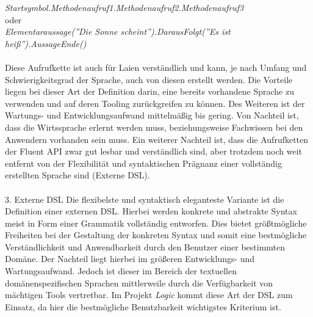\documentclass[11pt,a4paper,bibtotocnumbered]{scrreprt}
\begin{document}
\textit{Startsymbol.Methodenaufruf1.Methodenaufruf2.Methodenaufruf3}\\
oder\\
\textit{Elementaraussage(''Die Sonne scheint'').DarausFolgt(''Es ist heiß'').AussageEnde()}
\\
\\
Diese Aufrufkette ist auch für Laien verständlich und kann, je nach Umfang und Schwierigkeitsgrad der Sprache, auch von diesen erstellt werden. Die Vorteile liegen bei dieser Art der Definition darin, eine bereits vorhandene Sprache zu verwenden und auf deren Tooling zurückgreifen zu können. Des Weiteren ist der Wartungs- und Entwicklungsaufwand mittelmäßig bis gering. Von Nachteil ist, dass die Wirtssprache erlernt werden muss, beziehungsweise Fachwissen bei den Anwendern vorhanden sein muss. Ein weiterer Nachteil ist, dass die Aufrufketten der Fluent API zwar gut lesbar und verständlich sind, aber trotzdem noch weit entfernt von der Flexibilität und syntaktischen Prägnanz einer vollständig erstellten Sprache sind (Externe DSL).
\\
\\
3. Externe DSL
Die flexibelste und syntaktisch eleganteste Variante ist die Definition einer externen DSL. Hierbei werden konkrete und abstrakte Syntax meist in Form einer Grammatik vollständig entworfen. Dies bietet größtmögliche Freiheiten bei der Gestaltung der konkreten Syntax und somit eine bestmögliche Verständlichkeit und Anwendbarkeit durch den Benutzer einer bestimmten Domäne. Der Nachteil liegt hierbei im größeren Entwicklungs- und Wartungsaufwand. Jedoch ist dieser im Bereich der textuellen domänenspezifischen Sprachen mittlerweile durch die Verfügbarkeit von mächtigen Tools vertretbar.
Im Projekt \textit{Logic} kommt diese Art der DSL zum Einsatz, da hier die bestmögliche Benutzbarkeit wichtigstes Kriterium ist.
\end{document}
